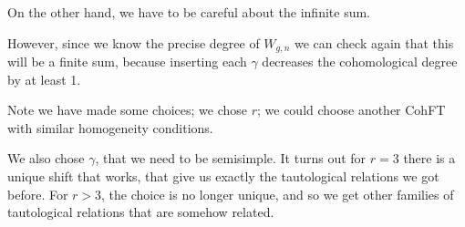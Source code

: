 \documentclass{amsart}
\theoremstyle{definition}
\begin{document}
On the other hand, we have to be careful about the infinite sum.

However, since we know the precise degree of $W_{g,n}$ we can check again that this will be a finite sum, because inserting each $\gamma$ decreases the cohomological degree by at least 1.

Note we have made some choices; we chose $r$; we could choose another CohFT with similar homogeneity conditions.

We also chose $\gamma$, that we need to be semisimple.  It turns out for $r=3$ there is a unique shift that works, that give us exactly the tautological relations we got before.  For $r>3$, the choice is no longer unique, and so we get other families of tautological relations that are somehow related.
\end{document}

